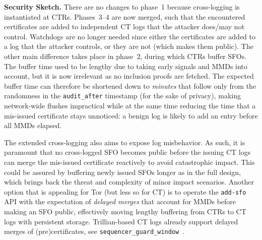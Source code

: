 \textbf{Security Sketch.} 
There are no changes to phase~1 because cross-logging is instantiated at CTRs.
Phases~3--4 are now merged, such that the encountered certificates are added to
independent CT logs that the attacker does/may not control.  Watchdogs are no
longer needed since either the certificates are added to a log that the attacker
controls, or they are not (which makes them public).  The other main difference takes place in phase~2,
during which CTRs buffer SFOs.  The buffer time used to be lengthy due to taking
early signals and MMDs into account, but it is now irrelevant as no inclusion
proofs are fetched.  The expected buffer time can therefore be shortened down
to \emph{minutes} that follow only from the randomness in the
\texttt{audit\_after} timestamp (for the sake of privacy), making network-wide
flushes impractical while at the same time reducing the time that a mis-issued
certificate stays unnoticed:
	a benign log is likely to add an entry before all MMDs elapsed.

The extended cross-logging also aims to expose log misbehavior.  As such, it is
paramount that no cross-logged SFO becomes public before the issuing CT logs can
merge the mis-issued certificate reactively to avoid catastrophic impact. This
could be assured by buffering newly issued SFOs longer as in the full design,
which brings back the threat and complexity of minor impact scenarios. Another
option that is appealing for Tor (but less so for CT) is to operate the
\texttt{add-sfo} API with the expectation of \emph{delayed merges} that account
for MMDs before making an SFO public, effectively moving lengthy buffering from
CTRs to CT logs with persistent storage.  Trillian-based CT logs already support
delayed merges of (pre)certificates, see
\texttt{sequencer\_guard\_window}~\cite{delayed-merge}.

